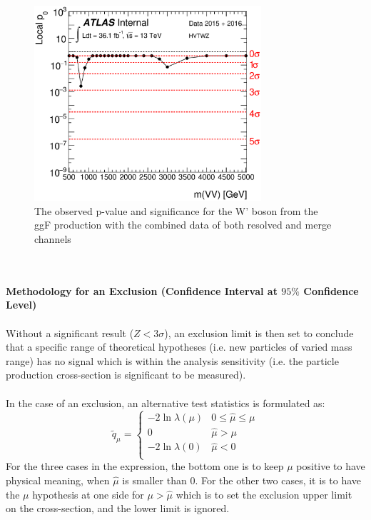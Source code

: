 \begin{figure}
	\includegraphics[width=0.75\textwidth]{Chapter4/VVM_p0_HVTWZ_ggF.eps}
	\caption{The observed p-value and significance for the W' boson from the ggF production with the combined data of both resolved and merge channels }
	\label{Fig:pvalue_hvt}
\end{figure}
\noindent
\\
\\{\bf Methodology for an Exclusion (Confidence Interval at $95\%$ Confidence Level)}
\\
\\Without a significant result ($Z<3\sigma$), an exclusion limit is then set to conclude that a specific range of theoretical hypotheses (i.e. new particles of varied mass range) has no signal which is within the analysis sensitivity (i.e. the particle production cross-section is significant to be measured). 
\\
\\In the case of an exclusion, an alternative test statistics is formulated as:
\begin{equation}
\tilde{q}_{\mu} = 
\begin{cases}
-2 \ln \lambda(\mu) & 0 \le \hat{\mu} \le \mu \\
0 & \hat{\mu} > \mu \\
-2 \ln \lambda(0) & \hat{\mu} < 0 \\
\end{cases}
\label{Eq:Sig_testQ}
\end{equation}
For the three cases in the expression, the bottom one is to keep $\mu$ positive to have physical meaning, when $\hat{\mu}$ is smaller than 0. For the other two cases, it is to have the $\mu$ hypothesis at one side for $\mu>\hat{\mu}$ which is to set the exclusion upper limit on the cross-section, and the lower limit is ignored. 
